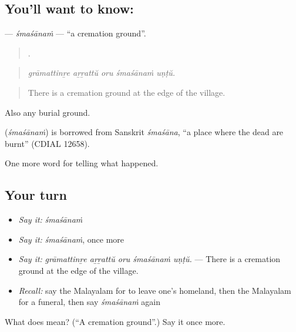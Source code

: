 \subsection*{You'll want to know: }
\textbf{} — \emph{śmaśānaṁ} — \textquotedblleft{}a cremation ground\textquotedblright{}.

\begin{quote}
    .
\end{quote}

\begin{quote}
\emph{grāmattinṟe aṟṟattŭ oru śmaśānaṁ uṇṭŭ.}
\end{quote}

\begin{quote}
There is a cremation ground at the edge of the village.
\end{quote}

Also any burial ground.

\begin{cousinweb}
\textbf{} (\emph{śmaśānaṁ}) is borrowed from Sanskrit \emph{śmaśāna}, \textquotedblleft{}a place where the dead are burnt\textquotedblright{} (CDIAL 12658).
\end{cousinweb}

\begin{grammarlens}[title={What you've built}]
One more word for telling what happened.
\end{grammarlens}

\subsection*{Your turn}
\begin{itemize}
\raggedright
  \item \emph{Say it:} \emph{śmaśānaṁ}
  \item \emph{Say it:} \emph{śmaśānaṁ}, once more
  \item \emph{Say it:} \emph{grāmattinṟe aṟṟattŭ oru śmaśānaṁ uṇṭŭ.} — There is a cremation ground at the edge of the village.
  \item \emph{Recall:} say the Malayalam for to leave one's homeland, then the Malayalam for a funeral, then say \emph{śmaśānaṁ} again
\end{itemize}

\begin{tcolorbox}[breakable,colback=teal!4,colframe=teal!35!black,title={Before you move on}]
What does  mean? (\textquotedblleft{}A cremation ground\textquotedblright{}.) Say it once more.
\end{tcolorbox}
